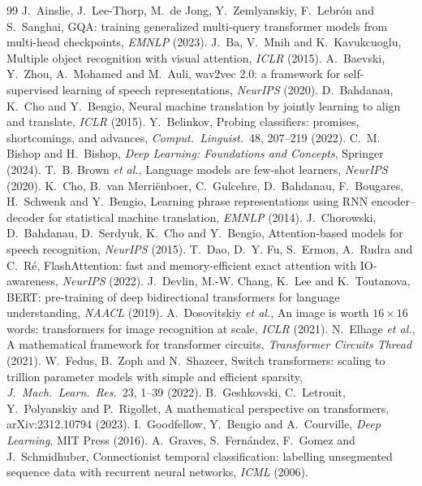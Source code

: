 \documentclass[11pt]{article}
\begin{document}
\begin{thebibliography}{99}\small
{} J.~Ainslie, J.~Lee-Thorp, M.~de Jong, Y.~Zemlyanskiy, F.~Lebrón and S.~Sanghai, GQA: training generalized multi-query transformer models from multi-head checkpoints, \emph{EMNLP} (2023).
 J.~Ba, V.~Mnih and K.~Kavukcuoglu, Multiple object recognition with visual attention, \emph{ICLR} (2015).
 A.~Baevski, Y.~Zhou, A.~Mohamed and M.~Auli, wav2vec 2.0: a framework for self-supervised learning of speech representations, \emph{NeurIPS} (2020).
 D.~Bahdanau, K.~Cho and Y.~Bengio, Neural machine translation by jointly learning to align and translate, \emph{ICLR} (2015).
 Y.~Belinkov, Probing classifiers: promises, shortcomings, and advances, \emph{Comput.\ Linguist.}\ 48, 207--219 (2022).
 C.~M. Bishop and H.~Bishop, \emph{Deep Learning: Foundations and Concepts}, Springer (2024).
 T.~B. Brown \emph{et al.}, Language models are few-shot learners, \emph{NeurIPS} (2020).
 K.~Cho, B.~van Merriënboer, C.~Gulcehre, D.~Bahdanau, F.~Bougares, H.~Schwenk and Y.~Bengio, Learning phrase representations using RNN encoder--decoder for statistical machine translation, \emph{EMNLP} (2014).
 J.~Chorowski, D.~Bahdanau, D.~Serdyuk, K.~Cho and Y.~Bengio, Attention-based models for speech recognition, \emph{NeurIPS} (2015).
 T.~Dao, D.~Y. Fu, S.~Ermon, A.~Rudra and C.~Ré, FlashAttention: fast and memory-efficient exact attention with IO-awareness, \emph{NeurIPS} (2022).
 J.~Devlin, M.-W. Chang, K.~Lee and K.~Toutanova, BERT: pre-training of deep bidirectional transformers for language understanding, \emph{NAACL} (2019).
 A.~Dosovitskiy \emph{et al.}, An image is worth $16 \times 16$ words: transformers for image recognition at scale, \emph{ICLR} (2021).
 N.~Elhage \emph{et al.}, A mathematical framework for transformer circuits, \emph{Transformer Circuits Thread} (2021).
 W.~Fedus, B.~Zoph and N.~Shazeer, Switch transformers: scaling to trillion parameter models with simple and efficient sparsity, \emph{J.\ Mach.\ Learn.\ Res.}\ 23, 1--39 (2022).
 B.~Geshkovski, C.~Letrouit, Y.~Polyanskiy and P.~Rigollet, A mathematical perspective on transformers, arXiv:2312.10794 (2023).
 I.~Goodfellow, Y.~Bengio and A.~Courville, \emph{Deep Learning}, MIT Press (2016).
 A.~Graves, S.~Fernández, F.~Gomez and J.~Schmidhuber, Connectionist temporal classification: labelling unsegmented sequence data with recurrent neural networks, \emph{ICML} (2006).

\end{thebibliography}
\end{document}
